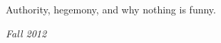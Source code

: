 Authority, hegemony, and why nothing is funny.

\begin{flushright}
\textit{Fall 2012}
\end{flushright}

%



\groupendnotes

